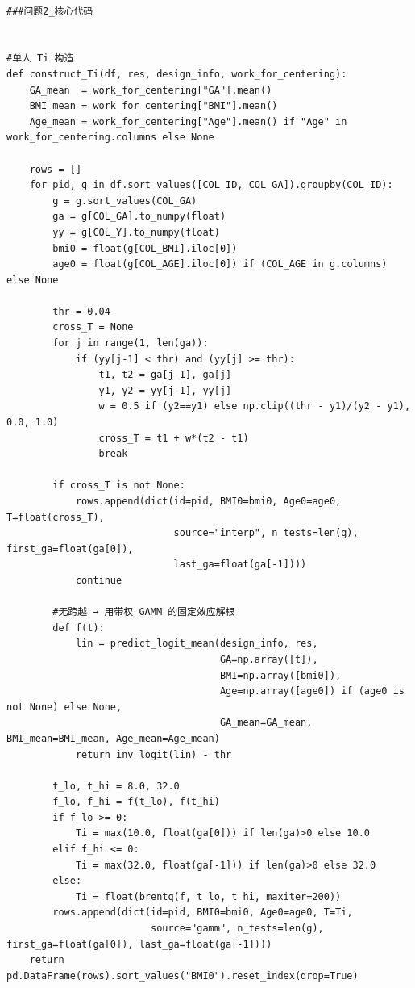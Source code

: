 \begin{lstlisting}

###问题2_核心代码


#单人 Ti 构造
def construct_Ti(df, res, design_info, work_for_centering):
    GA_mean  = work_for_centering["GA"].mean()
    BMI_mean = work_for_centering["BMI"].mean()
    Age_mean = work_for_centering["Age"].mean() if "Age" in work_for_centering.columns else None

    rows = []
    for pid, g in df.sort_values([COL_ID, COL_GA]).groupby(COL_ID):
        g = g.sort_values(COL_GA)
        ga = g[COL_GA].to_numpy(float)
        yy = g[COL_Y].to_numpy(float)
        bmi0 = float(g[COL_BMI].iloc[0])
        age0 = float(g[COL_AGE].iloc[0]) if (COL_AGE in g.columns) else None

        thr = 0.04
        cross_T = None
        for j in range(1, len(ga)):
            if (yy[j-1] < thr) and (yy[j] >= thr):
                t1, t2 = ga[j-1], ga[j]
                y1, y2 = yy[j-1], yy[j]
                w = 0.5 if (y2==y1) else np.clip((thr - y1)/(y2 - y1), 0.0, 1.0)
                cross_T = t1 + w*(t2 - t1)
                break

        if cross_T is not None:
            rows.append(dict(id=pid, BMI0=bmi0, Age0=age0, T=float(cross_T),
                             source="interp", n_tests=len(g), first_ga=float(ga[0]), 
                             last_ga=float(ga[-1])))
            continue

        #无跨越 → 用带权 GAMM 的固定效应解根
        def f(t):
            lin = predict_logit_mean(design_info, res,
                                     GA=np.array([t]),
                                     BMI=np.array([bmi0]),
                                     Age=np.array([age0]) if (age0 is not None) else None,
                                     GA_mean=GA_mean, BMI_mean=BMI_mean, Age_mean=Age_mean)
            return inv_logit(lin) - thr

        t_lo, t_hi = 8.0, 32.0
        f_lo, f_hi = f(t_lo), f(t_hi)
        if f_lo >= 0:
            Ti = max(10.0, float(ga[0])) if len(ga)>0 else 10.0
        elif f_hi <= 0:
            Ti = max(32.0, float(ga[-1])) if len(ga)>0 else 32.0
        else:
            Ti = float(brentq(f, t_lo, t_hi, maxiter=200))
        rows.append(dict(id=pid, BMI0=bmi0, Age0=age0, T=Ti,
                         source="gamm", n_tests=len(g), first_ga=float(ga[0]), last_ga=float(ga[-1])))
    return pd.DataFrame(rows).sort_values("BMI0").reset_index(drop=True)



\end{lstlisting}
